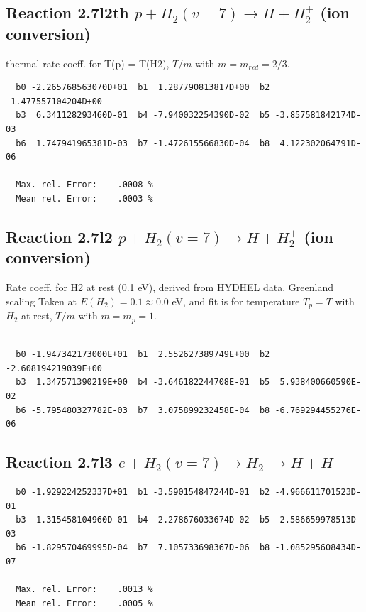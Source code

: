 \documentclass[12pt,dvipdfmx]{article}
\begin{document}
\subsection{
Reaction 2.7l2th
$ p + H_2(v=7) \rightarrow H + H_2^+$ (ion conversion)
}
thermal rate coeff. for T(p) = T(H2),
$T/m$ with $m=m_{red}=2/3$.

\begin{small}\begin{verbatim}
  b0 -2.265768563070D+01  b1  1.287790813817D+00  b2 -1.477557104204D+00
  b3  6.341128293460D-01  b4 -7.940032254390D-02  b5 -3.857581842174D-03
  b6  1.747941965381D-03  b7 -1.472615566830D-04  b8  4.122302064791D-06

  Max. rel. Error:    .0008 %
  Mean rel. Error:    .0003 %
\end{verbatim}\end{small}

\subsection{
Reaction 2.7l2
$ p + H_2(v=7) \rightarrow H + H_2^+$ (ion conversion)
}
Rate coeff. for H2 at rest (0.1 eV), derived from HYDHEL data. Greenland scaling
Taken at $E(H_2) = 0.1 \approx 0.0$ eV,  and fit is for temperature $T_p=T$ with $H_2$ at rest,
$T/m$ with $m=m_p=1$.

\begin{small}\begin{verbatim}

  b0 -1.947342173000E+01  b1  2.552627389749E+00  b2 -2.608194219039E+00
  b3  1.347571390219E+00  b4 -3.646182244708E-01  b5  5.938400660590E-02
  b6 -5.795480327782E-03  b7  3.075899232458E-04  b8 -6.769294455276E-06

\end{verbatim}\end{small}

\newpage

\subsection{
Reaction 2.7l3
 $ e + H_2(v=7) \rightarrow H_2^- \rightarrow H + H^-$
}


\begin{small}\begin{verbatim}
  b0 -1.929224252337D+01  b1 -3.590154847244D-01  b2 -4.966611701523D-01
  b3  1.315458104960D-01  b4 -2.278676033674D-02  b5  2.586659978513D-03
  b6 -1.829570469995D-04  b7  7.105733698367D-06  b8 -1.085295608434D-07

  Max. rel. Error:    .0013 %
  Mean rel. Error:    .0005 %
\end{verbatim}\end{small}
\end{document}
